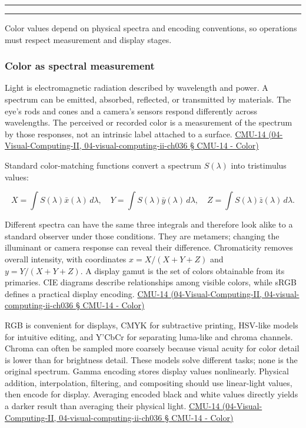 \begin{center}\rule{0.5\linewidth}{0.5pt}\end{center}

\begin{center}\rule{0.5\linewidth}{0.5pt}\end{center}

Color values depend on physical spectra and encoding conventions, so operations must respect measurement and display stages.

\subsubsection{Color as spectral measurement}\label{color-as-spectral-measurement}

Light is electromagnetic radiation described by wavelength and power. A spectrum can be emitted, absorbed, reflected, or transmitted by materials. The eye's rods and cones and a camera's sensors respond differently across wavelengths. The perceived or recorded color is a measurement of the spectrum by those responses, not an intrinsic label attached to a surface. \href{}{CMU-14 (04-Visual-Computing-II, 04-visual-computing-ii-ch036 § CMU-14 - Color)}

Standard color-matching functions convert a spectrum \(S(\lambda)\) into tristimulus values:

\[
X=\int S(\lambda)\bar x(\lambda)\,d\lambda,\quad
Y=\int S(\lambda)\bar y(\lambda)\,d\lambda,\quad
Z=\int S(\lambda)\bar z(\lambda)\,d\lambda.
\]

Different spectra can have the same three integrals and therefore look alike to a standard observer under those conditions. They are metamers; changing the illuminant or camera response can reveal their difference. Chromaticity removes overall intensity, with coordinates \(x=X/(X+Y+Z)\) and \(y=Y/(X+Y+Z)\). A display gamut is the set of colors obtainable from its primaries. CIE diagrams describe relationships among visible colors, while sRGB defines a practical display encoding. \href{}{CMU-14 (04-Visual-Computing-II, 04-visual-computing-ii-ch036 § CMU-14 - Color)}

RGB is convenient for displays, CMYK for subtractive printing, HSV-like models for intuitive editing, and Y'CbCr for separating luma-like and chroma channels. Chroma can often be sampled more coarsely because visual acuity for color detail is lower than for brightness detail. These models solve different tasks; none is the original spectrum. Gamma encoding stores display values nonlinearly. Physical addition, interpolation, filtering, and compositing should use linear-light values, then encode for display. Averaging encoded black and white values directly yields a darker result than averaging their physical light. \href{}{CMU-14 (04-Visual-Computing-II, 04-visual-computing-ii-ch036 § CMU-14 - Color)}

